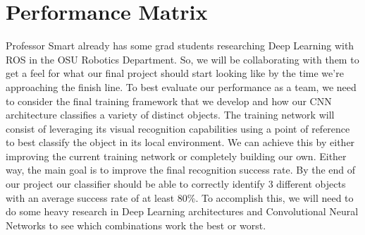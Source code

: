 \documentclass[a4paper, 10pt]{article}
\begin{document}
\section{Performance Matrix}
Professor Smart already has some grad students researching Deep Learning with ROS in the OSU Robotics Department. So, we will be collaborating with them to get a feel for what our final project should start looking like by the time we’re approaching the finish line. To best evaluate our performance as a team, we need to consider the final training framework that we develop and how our CNN architecture classifies a variety of distinct objects. The training network will consist of leveraging its visual recognition capabilities using a point of reference to best classify the object in its local environment. We can achieve this by either improving the current training network or completely building our own. Either way, the main goal is to improve the final recognition success rate. By the end of our project our classifier should be able to correctly identify 3 different objects with an average success rate of at least 80\%. To accomplish this, we will need to do some heavy research in Deep Learning architectures and Convolutional Neural Networks to see which combinations work the best or worst. 
\end{document}
